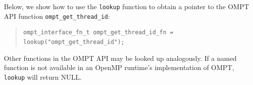 \documentclass{article}
\begin{document}
Below, we show how to use the \verb|lookup| function to obtain a pointer to the OMPT API function \verb|ompt_get_thread_id|:

\begin{quote}
\begin{verbatim}
ompt_interface_fn_t ompt_get_thread_id_fn = lookup("ompt_get_thread_id");
\end{verbatim}
\end{quote}
Other functions in the OMPT API may be looked up analogously.
If a named function is not available in an OpenMP runtime's implementation of OMPT, \verb|lookup| will return NULL.

\end{document}
